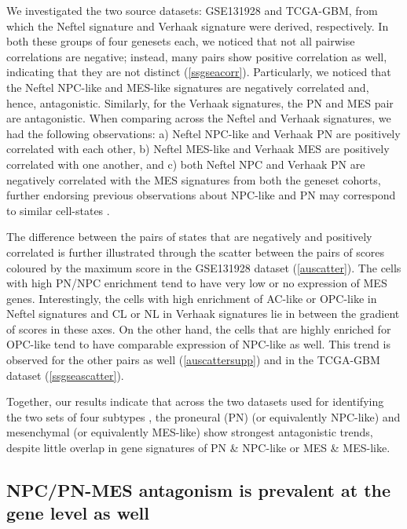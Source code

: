 \documentclass[11pt,a4paper]{article}
\begin{document}
We investigated the two source datasets: GSE131928 and TCGA-GBM, from which the Neftel signature and Verhaak signature were derived, respectively. In both these groups of four genesets each, we noticed that not all pairwise correlations are negative; instead, many pairs show positive correlation as well, indicating that they are not distinct (\autoref{ssgseacorr}). Particularly, we noticed that the Neftel NPC-like and MES-like signatures are negatively correlated and, hence, antagonistic. Similarly, for the Verhaak signatures, the PN and MES pair are antagonistic. When comparing across the Neftel and Verhaak signatures, we had the following observations: a) Neftel NPC-like and Verhaak PN are positively correlated with each other, b) Neftel MES-like and Verhaak MES are positively correlated with one another, and c) both Neftel NPC and Verhaak PN are negatively correlated with the MES signatures from both the geneset cohorts, further endorsing previous observations about NPC-like and PN may correspond to similar cell-states \parencite{Neftel}.

The difference between the pairs of states that are negatively and positively correlated is further illustrated through the scatter between the pairs of scores coloured by the maximum score in the GSE131928 dataset (\autoref{auscatter}). The cells with high PN/NPC enrichment tend to have very low or no expression of MES genes. Interestingly, the cells with high enrichment of AC-like or OPC-like in Neftel signatures and CL or NL in Verhaak signatures lie in between the gradient of scores in these axes. On the other hand, the cells that are highly enriched for OPC-like tend to have comparable expression of NPC-like as well. This trend is observed for the other pairs as well (\autoref{auscattersupp}) and in the TCGA-GBM dataset (\autoref{ssgseascatter}). 

Together, our results indicate that across the two datasets used for identifying the two sets of four subtypes \parencite{Neftel, Verhaak}, the proneural (PN) (or equivalently NPC-like) and mesenchymal (or equivalently MES-like) show strongest antagonistic trends, despite little overlap in gene signatures of PN \& NPC-like or MES \& MES-like.

\subsection{NPC/PN-MES antagonism is prevalent at the gene level as well}
\end{document}
